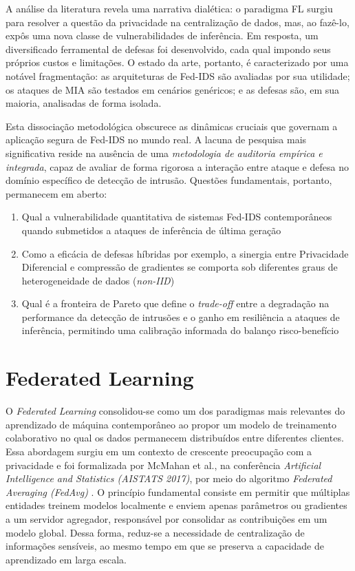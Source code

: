 \documentclass[
	12pt,				%
	openright,			%
	oneside,			%
	a4paper,			%
	english,			%
	french,				%
	spanish,			%
	brazil,				%
	]{abntex2}
\begin{document}
A análise da literatura revela uma narrativa dialética: o paradigma FL surgiu para resolver a questão da privacidade na centralização de dados, mas, ao fazê-lo, expôs uma nova classe de vulnerabilidades de inferência. Em resposta, um diversificado ferramental de defesas foi desenvolvido, cada qual impondo seus próprios custos e limitações. O estado da arte, portanto, é caracterizado por uma notável fragmentação: as arquiteturas de Fed-IDS são avaliadas por sua utilidade; os ataques de MIA são testados em cenários genéricos; e as defesas são, em sua maioria, analisadas de forma isolada.

Esta dissociação metodológica obscurece as dinâmicas cruciais que governam a aplicação segura de Fed-IDS no mundo real. A lacuna de pesquisa mais significativa reside na ausência de uma \textit{metodologia de auditoria empírica e integrada}, capaz de avaliar de forma rigorosa a interação entre ataque e defesa no domínio específico de detecção de intrusão. Questões fundamentais, portanto, permanecem em aberto:
\begin{enumerate}
    \item Qual a vulnerabilidade quantitativa de sistemas Fed-IDS contemporâneos quando submetidos a ataques de inferência de última geração
    \item Como a eficácia de defesas híbridas  por exemplo, a sinergia entre Privacidade Diferencial e compressão de gradientes  se comporta sob diferentes graus de heterogeneidade de dados (\textit{non-IID})
    \item Qual é a fronteira de Pareto que define o \textit{trade-off} entre a degradação na performance da detecção de intrusões e o ganho em resiliência a ataques de inferência, permitindo uma calibração informada do balanço risco-benefício
\end{enumerate}

\section{Federated Learning}

O \textit{Federated Learning} consolidou-se como um dos paradigmas mais relevantes do aprendizado de máquina contemporâneo ao propor um modelo de treinamento colaborativo no qual os dados permanecem distribuídos entre diferentes clientes. Essa abordagem surgiu em um contexto de crescente preocupação com a privacidade e foi formalizada por McMahan et al., na conferência \textit{Artificial Intelligence and Statistics (AISTATS 2017)}, por meio do algoritmo \textit{Federated Averaging (FedAvg)} \cite{mcmahan2017fedavg}. O princípio fundamental consiste em permitir que múltiplas entidades treinem modelos localmente e enviem apenas parâmetros ou gradientes a um servidor agregador, responsável por consolidar as contribuições em um modelo global. Dessa forma, reduz-se a necessidade de centralização de informações sensíveis, ao mesmo tempo em que se preserva a capacidade de aprendizado em larga escala.
\end{document}
